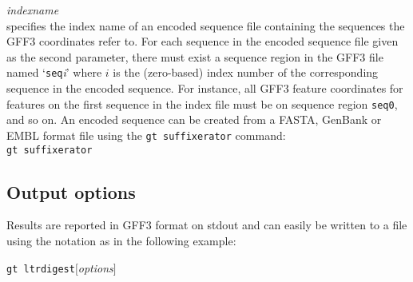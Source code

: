 \documentclass[12pt,titlepage]{article}
\newcommand{\GtLTRdigest}{\texttt{gt ltrdigest}\xspace}
\newcommand{\Gtsuffixerator}{\texttt{gt suffixerator}\xspace}
\begin{document}
\emph{indexname}\\ specifies the index name of an encoded sequence file
containing the sequences the GFF3 coordinates refer to. For each sequence in the
encoded sequence file given as the second parameter, there must exist a sequence
region in the GFF3 file named `\texttt{seq}\textit{i}' where $i$ is the
(zero-based) index number of the corresponding sequence in the encoded sequence.
For instance, all GFF3 feature coordinates for features on the first sequence in
the index file must be on sequence region \texttt{seq0}, and so on. An encoded
sequence can be created from a FASTA, GenBank or EMBL format file using the
\Gtsuffixerator command:\\
\Gtsuffixerator {}  
  
 

\subsection{Output options}

Results are reported in GFF3 format on stdout and can easily
be written to a file using the notation \texttt{}
 as in the following example:

\GtLTRdigest $[$\emph{options}$]$ 
 \texttt{} 
\end{document}

